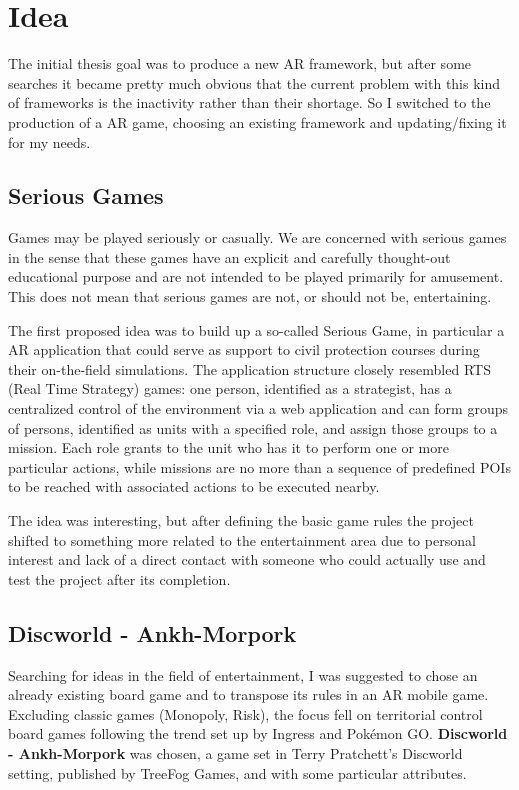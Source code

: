 \chapter{Idea}

	The initial thesis goal was to produce a new AR framework, but after some searches it became pretty much obvious that the current problem with this kind of frameworks is the inactivity rather than their shortage.
	So I switched to the production of a AR game, choosing an existing framework and updating/fixing it for my needs.
	
	\section{Serious Games}
	
		\begin{quoting}
			Games may be played seriously or casually. We are concerned with serious games in the sense that these games have an explicit and carefully thought-out educational purpose and are not intended to be played primarily for amusement. This does not mean that serious games are not, or should not be, entertaining.~\cite{abt:serious}
		\end{quoting}
	
		The first proposed idea was to build up a so-called Serious Game, in particular a AR application that could serve as support to civil protection courses during their on-the-field simulations.
		The application structure closely resembled RTS (Real Time Strategy) games: one person, identified as a strategist, has a centralized control of the environment via a web application and can form groups of persons, identified as units with a specified role, and assign those groups to a mission.
		Each role grants to the unit who has it to perform one or more particular actions, while missions are no more than a sequence of predefined POIs to be reached with associated actions to be executed nearby.
		
		The idea was interesting, but after defining the basic game rules the project shifted to something more related to the entertainment area due to personal interest and lack of a direct contact with someone who could actually use and test the project after its completion.
	
	\section{Discworld - Ankh-Morpork}
	
		Searching for ideas in the field of entertainment, I was suggested to chose an already existing board game and to transpose its rules in an AR mobile game.
		Excluding classic games (Monopoly, Risk), the focus fell on territorial control board games following the trend set up by Ingress and Pokémon GO.
		\textbf{Discworld - Ankh-Morpork} was chosen, a game set in Terry Pratchett's Discworld setting, published by TreeFog Games, and with some particular attributes.
		
